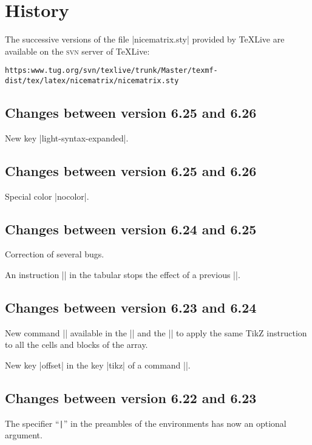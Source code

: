 \documentclass[dvipsnames]{article}%
\begin{document}
\section{History}

The successive versions of the file |nicematrix.sty| provided by TeXLive are available on the
\textsc{svn} server of TeXLive:\par\nobreak

\smallskip
{
\small
\nolinkurl{https:www.tug.org/svn/texlive/trunk/Master/texmf-dist/tex/latex/nicematrix/nicematrix.sty}
}

\subsection*{Changes between version 6.25 and 6.26}

New key |light-syntax-expanded|.

\subsection*{Changes between version 6.25 and 6.26}

Special color |nocolor|.

\subsection*{Changes between version 6.24 and 6.25}

Correction of several bugs.

An instruction |\rowlistcolors| in the tabular stops the effect of a previous
|\rowlistcolors|.


\subsection*{Changes between version 6.23 and 6.24}

New command |\TikzEveryCell| available in the |\CodeAfter| and the |\CodeBefore|
to apply the same TikZ instruction to all the cells and blocks of the array.

New key |offset| in the key |tikz| of a command |\Block|.


\subsection*{Changes between version 6.22 and 6.23}

The specifier ``\verb+|+'' in the preambles of the environments has now an
optional argument.
\end{document}
